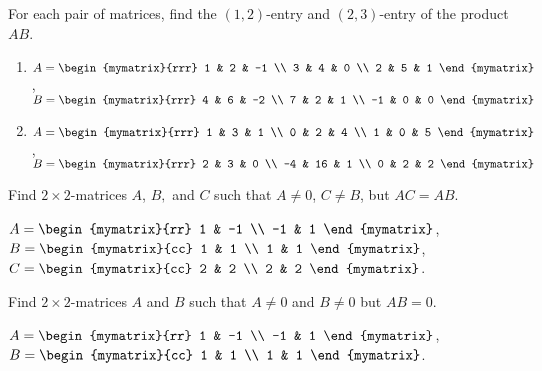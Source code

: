 \begin{enumialphparenastyle}
\begin{ex} For each pair of matrices, find the $(1,2)$-entry and
  $(2,3)$-entry of the product $AB$.
  \begin{enumerate}  
  \item 
    $A = \begin{mymatrix}{rrr}
      1 & 2 & -1 \\
      3 & 4 & 0 \\
      2 & 5 & 1 
    \end{mymatrix}$, $B = \begin{mymatrix}{rrr}
      4 & 6 & -2 \\
      7 & 2 & 1 \\
      -1 & 0 & 0 
    \end{mymatrix}$
  \item 
    $A = \begin{mymatrix}{rrr}
      1 & 3 & 1 \\
      0 & 2 & 4 \\
      1 & 0 & 5 
    \end{mymatrix}$, $B = \begin{mymatrix}{rrr}
      2 & 3 & 0 \\
      -4 & 16 & 1 \\
      0 & 2 & 2
    \end{mymatrix}$
  \end{enumerate} 
\end{ex}

\begin{ex} Find $2\times 2$-matrices $A$, $B,$ and $C$ such that
  $A\neq 0$, $C\neq B$,
  but $AC=AB$. 
  \begin{sol}
    $A = \begin{mymatrix}{rr}
      1 & -1 \\
      -1 & 1
    \end{mymatrix}$, $B = \begin{mymatrix}{cc}
      1 & 1 \\
      1 & 1
    \end{mymatrix}$, $C = \begin{mymatrix}{cc}
      2 & 2 \\
      2 & 2
    \end{mymatrix}$. 
  \end{sol}
\end{ex}

\begin{ex} Find $2\times 2$-matrices $A$ and $B$ such that $A \neq 0$
  and $B \neq 0$ but $AB = 0$.
  \begin{sol}
    $A = \begin{mymatrix}{rr}
      1 & -1 \\
      -1 & 1
    \end{mymatrix}$, $B = \begin{mymatrix}{cc}
      1 & 1 \\
      1 & 1
    \end{mymatrix}$. 
  \end{sol}
\end{ex}


\end{enumialphparenastyle}
